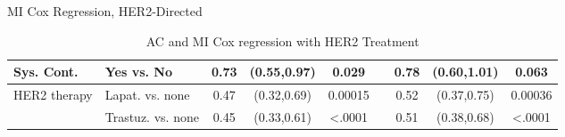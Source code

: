 \begin{frame}{MI Cox Regression, HER2-Directed}
\begin{table}[]
{\begin{tabular}{|l|l|c|c|c|c|c|c|c|}
Sys. Cont.                     & Yes vs. No                       & 0.73                  & (0.55,0.97)                                        & 0.029                 &                       & 0.78 & (0.60,1.01)                                                          & 0.063                                                       \\ \hline
\rowcolor[HTML]{FE0000} 
HER2 therapy                   & Lapat. vs. none                   & 0.47                  & (0.32,0.69)                                        & 0.00015               &                       & 0.52 & (0.37,0.75)                                                          & 0.00036                                                     \\ \hline
\rowcolor[HTML]{FE0000} 

                               & Trastuz. vs. none                 & 0.45                  & (0.33,0.61)                                        & \textless.0001        &                       & 0.51 & (0.38,0.68)                                                          & \textless.0001                                              \\ \hline
\end{tabular}
}
\caption{AC and MI Cox regression with HER2 Treatment}

\end{table}
\end{frame}